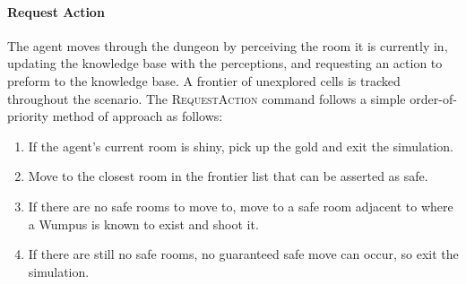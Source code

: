 \paragraph{Request Action}
The agent moves through the dungeon by perceiving the room it is currently in, updating the knowledge base with the perceptions, and requesting an action to preform to the knowledge base. 
A frontier of unexplored cells is tracked throughout the scenario.
The \textsc{RequestAction} command follows a simple order-of-priority method of approach as follows:
\begin{enumerate}
	\item If the agent's current room is shiny, pick up the gold and exit the simulation.
    \item Move to the closest room in the frontier list that can be asserted as safe.
    \item If there are no safe rooms to move to, move to a safe room adjacent to where a Wumpus is known to exist and shoot it.
    \item If there are still no safe rooms, no guaranteed safe move can occur, so exit the simulation.
\end{enumerate}


